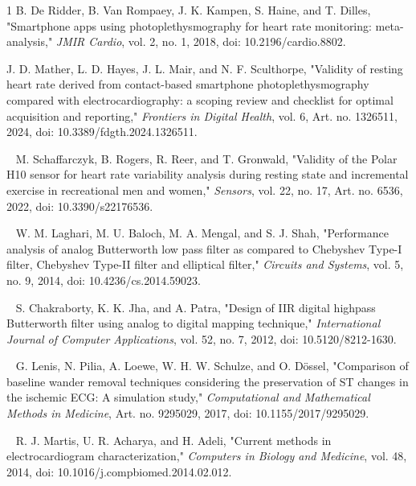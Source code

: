 \documentclass{citask}
\begin{document}
\begin{thebibliography}{1}
B. De Ridder, B. Van Rompaey, J. K. Kampen, S. Haine, and T. Dilles, "Smartphone apps using photoplethysmography for heart rate monitoring: meta-analysis," \emph{JMIR Cardio}, vol. 2, no. 1, 2018, doi: 10.2196/cardio.8802.

J. D. Mather, L. D. Hayes, J. L. Mair, and N. F. Sculthorpe, "Validity of resting heart rate derived from contact-based smartphone photoplethysmography compared with electrocardiography: a scoping review and checklist for optimal acquisition and reporting," \emph{Frontiers in Digital Health}, vol. 6, Art. no. 1326511, 2024, doi: 10.3389/fdgth.2024.1326511.

M. Schaffarczyk, B. Rogers, R. Reer, and T. Gronwald, "Validity of the Polar H10 sensor for heart rate variability analysis during resting state and incremental exercise in recreational men and women," \emph{Sensors}, vol. 22, no. 17, Art. no. 6536, 2022, doi: 10.3390/s22176536.

W. M. Laghari, M. U. Baloch, M. A. Mengal, and S. J. Shah, "Performance analysis of analog Butterworth low pass filter as compared to Chebyshev Type-I filter, Chebyshev Type-II filter and elliptical filter," \emph{Circuits and Systems}, vol. 5, no. 9, 2014, doi: 10.4236/cs.2014.59023.

S. Chakraborty, K. K. Jha, and A. Patra, "Design of IIR digital highpass Butterworth filter using analog to digital mapping technique," \emph{International Journal of Computer Applications}, vol. 52, no. 7, 2012, doi: 10.5120/8212-1630.

G. Lenis, N. Pilia, A. Loewe, W. H. W. Schulze, and O. Dössel, "Comparison of baseline wander removal techniques considering the preservation of ST changes in the ischemic ECG: A simulation study," \emph{Computational and Mathematical Methods in Medicine}, Art. no. 9295029, 2017, doi: 10.1155/2017/9295029.

R. J. Martis, U. R. Acharya, and H. Adeli, "Current methods in electrocardiogram characterization," \emph{Computers in Biology and Medicine}, vol. 48, 2014, doi: 10.1016/j.compbiomed.2014.02.012.


\end{thebibliography}
\end{document}
